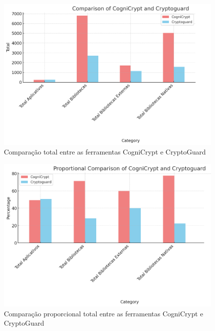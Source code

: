 \begin{figure}[!ht]
  \centering
  \includegraphics[scale=0.7]{img/plot_cc_x_cg_summary.png}
  \caption{Comparação total entre as ferramentas CogniCrypt e CryptoGuard}
  \label{img: CCvsCG_Summary}
\end{figure}

\FloatBarrier

\begin{figure}[!ht]
  \centering
  \includegraphics[scale=0.7]{img/plot_cc_x_cg_proportion_summary.png}
  \caption{Comparação proporcional total entre as ferramentas CogniCrypt e CryptoGuard}
  \label{img: CCvsCG_Summary2}
\end{figure}

\FloatBarrier

